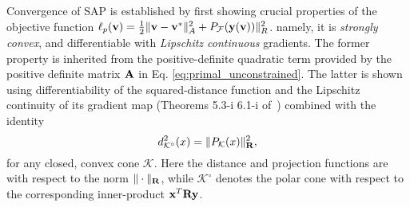 \newcommand{\coneName}{\mathcal{K}}
\newcommand{\dist}{d}
\newcommand{\cond}{\text{cond}}
\newcommand{\vx}{\mf{v}}
\newcommand{\fx}{\ell_p(\mf{\vx})}

\newcommand{\vy}{\mf{u}}
\newcommand{\fy}{\ell_p(\mf{\vy})}
\newcommand{\vd}{\mf{d}}

\renewcommand\qedsymbol{$\IEEEQED$}

Convergence of SAP is established
by first showing crucial properties
of the objective function 
$\ell_p({\mathbf{v}}) = \frac{1}{2}\Vert{\mathbf{v}}-{\mathbf{v}}^*\Vert_{A}^2 + P_\mathcal{F}({\mathbf{y}}({\mathbf{v}}))\Vert_R^2$.
namely, it is  \emph{strongly convex},
and differentiable with \emph{Lipschitz continuous} gradients.  The
former property is inherited from the positive-definite quadratic term 
provided by the positive definite matrix ${\mathbf{A}}$ in Eq. \eqref{eq:primal_unconstrained}.  The latter is shown using differentiability of the squared-distance function
 and the Lipschitz continuity of its gradient map (Theorems 5.3-i 6.1-i of~\cite{bib:delfour2011shapes})
 combined with the identity
\[
  \dist^2_{\coneName^\circ}(x) = \|P_{\coneName}(x)\|_{\mf{R}}^2,
\] 
for any closed, convex cone $\coneName$. Here 
the distance and projection functions are with respect to the
norm $\|\cdot\|_{\mathbf{R}}$, while $\coneName^\circ$ denotes the polar
cone with respect to the corresponding inner-product ${\mathbf{x}}^T {\mathbf{R}} {\mathbf{y}}$.
